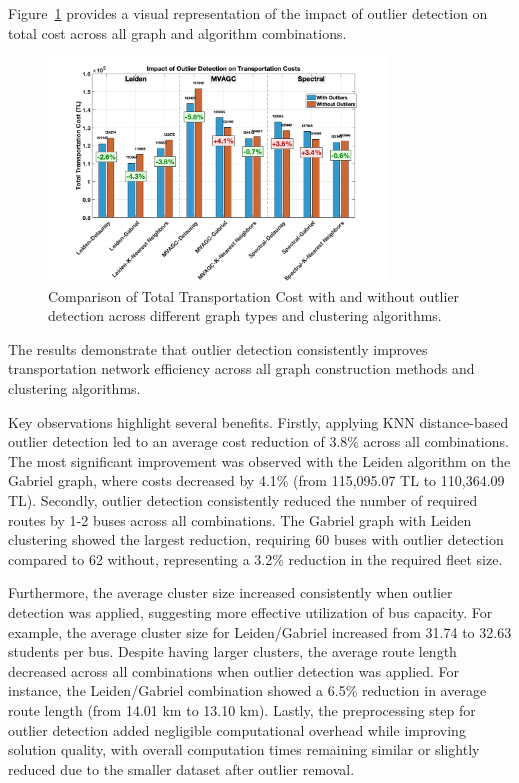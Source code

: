 Figure~\ref{fig:outlier_cost_comparison} provides a visual representation of the impact of outlier detection on total cost across all graph and algorithm combinations.

\begin{figure}[h]
    \centering
    \includegraphics[width=0.8\textwidth]{img/outlier_cost_comparison}
    \caption{Comparison of Total Transportation Cost with and without outlier detection across different graph types and clustering algorithms.}
    \label{fig:outlier_cost_comparison}
\end{figure}


The results demonstrate that outlier detection consistently improves transportation network efficiency across all graph construction methods and clustering algorithms.

Key observations highlight several benefits. Firstly, applying KNN distance-based outlier detection led to an average cost reduction of 3.8\% across all combinations. The most significant improvement was observed with the Leiden algorithm on the Gabriel graph, where costs decreased by 4.1\% (from 115,095.07 TL to 110,364.09 TL). Secondly, outlier detection consistently reduced the number of required routes by 1-2 buses across all combinations. The Gabriel graph with Leiden clustering showed the largest reduction, requiring 60 buses with outlier detection compared to 62 without, representing a 3.2\% reduction in the required fleet size.

Furthermore, the average cluster size increased consistently when outlier detection was applied, suggesting more effective utilization of bus capacity. For example, the average cluster size for Leiden/Gabriel increased from 31.74 to 32.63 students per bus. Despite having larger clusters, the average route length decreased across all combinations when outlier detection was applied. For instance, the Leiden/Gabriel combination showed a 6.5\% reduction in average route length (from 14.01 km to 13.10 km). Lastly, the preprocessing step for outlier detection added negligible computational overhead while improving solution quality, with overall computation times remaining similar or slightly reduced due to the smaller dataset after outlier removal.

